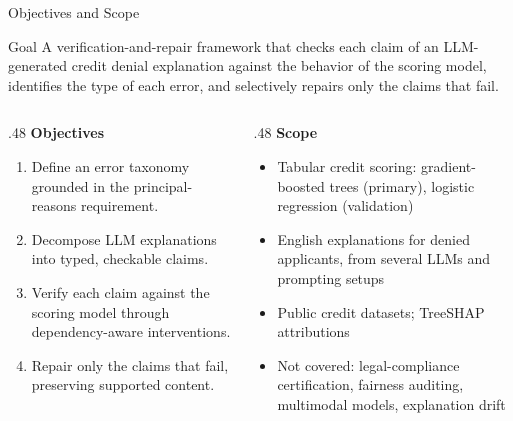 \documentclass[aspectratio=169,10pt]{beamer}
\begin{document}
\begin{frame}{Objectives and Scope}
  \begin{block}{Goal}
    A verification-and-repair framework that checks each claim of an LLM-generated credit denial explanation against the behavior of the scoring model, identifies the type of each error, and selectively repairs only the claims that fail.
  \end{block}
  \vspace{1ex}
  \begin{columns}[T]
    \begin{column}{.48\textwidth}
      {\small\bfseries Objectives}
      \begin{enumerate}\small
        \setlength{\itemsep}{0.8ex}
        \item Define an error taxonomy grounded in the principal-reasons requirement.
        \item Decompose LLM explanations into typed, checkable claims.
        \item Verify each claim against the scoring model through dependency-aware interventions.
        \item Repair only the claims that fail, preserving supported content.
      \end{enumerate}
    \end{column}
    \begin{column}{.48\textwidth}
      {\small\bfseries Scope}
      \begin{itemize}\small
        \setlength{\itemsep}{0.8ex}
        \item Tabular credit scoring: gradient-boosted trees (primary), logistic regression (validation)
        \item English explanations for denied applicants, from several LLMs and prompting setups
        \item Public credit datasets; TreeSHAP attributions
        \item Not covered: legal-compliance certification, fairness auditing, multimodal models, explanation drift
      \end{itemize}
    \end{column}
  \end{columns}
\end{frame}
\end{document}

